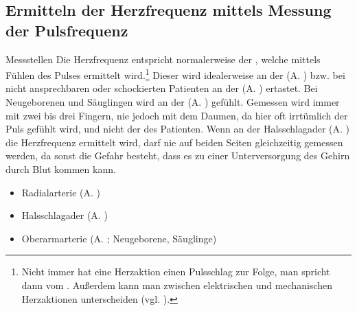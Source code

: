 


\subsection{Ermitteln der Herzfrequenz mittels Messung der
Pulsfrequenz}
\label{topic:pulsmessung}
 


{Messstellen}
{%
Die Herzfrequenz entspricht normalerweise der
, welche mittels Fühlen des Pulses 
ermittelt wird.\footnote{Nicht
immer hat eine Herzaktion einen Pulsschlag zur Folge, man
spricht dann vom . Außerdem kann man
zwischen elektrischen und mechanischen Herzaktionen
unterscheiden (vgl. ).}
Dieser wird idealerweise an der
 (A. ) bzw. bei nicht
ansprechbaren oder schockierten Patienten an der
 (A. ) ertastet. Bei
Neugeborenen und Säuglingen wird an der
 (A. ) gefühlt. Gemessen
wird immer mit zwei bis drei Fingern, nie jedoch mit dem
Daumen, da hier oft irrtümlich der  Puls gefühlt
wird, und nicht der des Patienten. Wenn an der
Halsschlagader (A. ) die Herzfrequenz ermittelt
wird, darf nie auf beiden Seiten gleichzeitig gemessen
werden, da sonst die Gefahr besteht,
dass es zu einer Unterversorgung des Gehirn durch Blut kommen
kann.
}
{%
\begin{itemize}
  \item {Radialarterie} (A. )
  \item {Halsschlagader} (A. )
  \item {Oberarmarterie} (A. ; Neugeborene, Säuglinge)
\end{itemize}
}
{}
{}
{}

